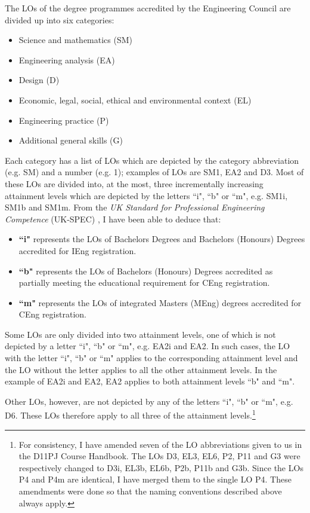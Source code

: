 The LOs of the degree programmes accredited by the Engineering Council are divided up into six categories:
\begin{itemize}
    \item Science and mathematics (SM)
    \item Engineering analysis (EA)
    \item Design (D)
    \item Economic, legal, social, ethical and environmental context (EL)
    \item Engineering practice (P)
    \item Additional general skills (G)
\end{itemize}
Each category has a list of LOs which are depicted by the category abbreviation (e.g. SM) and a number (e.g. 1); examples of LOs are SM1, EA2 and D3.
Most of these LOs are divided into, at the most, three incrementally increasing attainment levels which are depicted by the letters ``i", ``b" or ``m", e.g. SM1i, SM1b and SM1m.
From the \textit{UK Standard for Professional Engineering Competence} (UK-SPEC) \citep{EngineeringCouncil2014}, 
I have been able to deduce that:
\begin{itemize}
    \item \textbf{``i"} represents the LOs of Bachelors Degrees and Bachelors (Honours) Degrees accredited for IEng registration.
    \item \textbf{``b"} represents the LOs of Bachelors (Honours) Degrees accredited as partially meeting the educational requirement for CEng registration.
    \item \textbf{``m"} represents the LOs of integrated Masters (MEng) degrees accredited for CEng registration.
\end{itemize}

Some LOs are only divided into two attainment levels, one of which is not depicted by a letter ``i", ``b" or ``m", e.g. EA2i and EA2.
In such cases, the LO with the letter ``i", ``b" or ``m" applies to the corresponding attainment level and the LO without the letter applies to all the other attainment levels.
In the example of EA2i and EA2, EA2 applies to both attainment levels ``b" and ``m".

Other LOs, however, are not depicted by any of the letters ``i", ``b" or ``m", e.g. D6.
These LOs therefore apply to all three of the attainment levels.\footnote{
For consistency, I have amended seven of the LO abbreviations given to us in the D11PJ Course Handbook.
The LOs D3, EL3, EL6, P2, P11 and G3 were respectively changed to D3i, EL3b, EL6b, P2b, P11b and G3b.
Since the LOs P4 and P4m are identical, I have merged them to the single LO P4.
These amendments were done so that the naming conventions described above always apply.}


